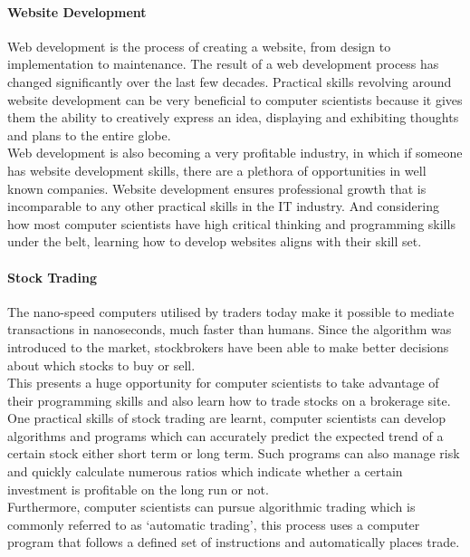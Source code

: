 \documentclass[a4paper, 11pt]{report}
\begin{document}
	\paragraph{Website Development} Web development is the process of creating a website, from design to implementation to maintenance. The result of a web development process has changed significantly over the last few decades. Practical skills revolving around website development can be very beneficial to computer scientists because it gives them the ability to creatively express an idea, displaying and exhibiting thoughts and plans to the entire globe.
	\\ Web development is also becoming a very profitable industry, in which if someone has website development skills, there are a plethora of opportunities in well known companies. Website development ensures professional growth that is incomparable to any other practical skills in the IT industry. And considering how most computer scientists have high critical thinking and programming skills under the belt, learning how to develop websites aligns with their skill set.

	\paragraph {Stock Trading} The nano-speed computers utilised by traders today make it possible to mediate transactions in nanoseconds, much faster than humans. Since the algorithm was introduced to the market, stockbrokers have been able to make better decisions about which stocks to buy or sell.
	\\ This presents a huge opportunity for computer scientists to take advantage of their programming skills and also learn how to trade stocks on a brokerage site. One practical skills of stock trading are learnt, computer scientists can develop algorithms and programs which can accurately predict the expected trend of a certain stock either short term or long term. Such programs can also manage risk and quickly calculate numerous ratios which indicate whether a certain investment is profitable on the long run or not.
	\\ Furthermore, computer scientists can pursue algorithmic trading which is commonly referred to as ‘automatic trading’, this process uses a computer program that follows a defined set of instructions and automatically places trade.
\end{document}
